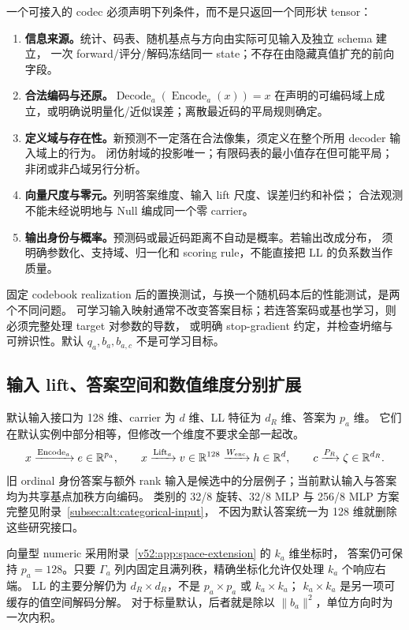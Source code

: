 \documentclass[11pt,UTF8,fontset=fandol]{ctexart}
\numberwithin{equation}{section}
\theoremstyle{definition}
\begin{document}
一个可接入的 codec 必须声明下列条件，而不是只返回一个同形状 tensor：
\begin{enumerate}
\item \textbf{信息来源。}统计、码表、随机基点与方向由实际可见输入及独立 schema 建立，
一次 forward/评分/解码冻结同一 state；不存在由隐藏真值扩充的前向字段。
\item \textbf{合法编码与还原。}$\operatorname{Decode}_a(\operatorname{Encode}_a(x))=x$
在声明的可编码域上成立，或明确说明量化/近似误差；离散最近码的平局规则确定。
\item \textbf{定义域与存在性。}新预测不一定落在合法像集，须定义在整个所用 decoder 输入域上的行为。
闭仿射域的投影唯一；有限码表的最小值存在但可能平局；非闭或非凸域另行分析。
\item \textbf{向量尺度与零元。}列明答案维度、输入 lift 尺度、误差归约和补偿；
合法观测不能未经说明地与 Null 编成同一个零 carrier。
\item \textbf{输出身份与概率。}预测码或最近码距离不自动是概率。若输出改成分布，
须明确参数化、支持域、归一化和 scoring rule，不能直接把 LL 的负系数当作质量。
\end{enumerate}
固定 codebook realization 后的置换测试，与换一个随机码本后的性能测试，是两个不同问题。
可学习输入映射通常不改变答案目标；若连答案码或基也学习，则必须完整处理 target 对参数的导数，
或明确 stop-gradient 约定，并检查坍缩与可辨识性。默认 $q_a,b_a,b_{a,c}$ 不是可学习目标。

\subsection{输入 lift、答案空间和数值维度分别扩展}
默认输入接口为 128 维、carrier 为 $d$ 维、LL 特征为 $d_R$ 维、答案为 $p_a$ 维。
它们在默认实例中部分相等，但修改一个维度不要求全部一起改。
\begin{equation}
 x\xrightarrow{\operatorname{Encode}_a}e\in\mathbb R^{p_a},\qquad
 x\xrightarrow{\operatorname{Lift}_a}v\in\mathbb R^{128}
 \xrightarrow{W_{\rm enc}}h\in\mathbb R^d,
 \qquad c\xrightarrow{P_R}\zeta\in\mathbb R^{d_R}.
 \label{v52:eq:dimension-contract}
\end{equation}
旧 ordinal 身份答案与额外 rank 输入是候选中的分层例子；当前默认输入与答案均为共享基点加秩方向编码。
类别的 32/8 旋转、32/8 MLP 与 256/8 MLP 方案完整见附录~\ref{subsec:alt:categorical-input}，
不因为默认答案统一为 128 维就删除这些研究接口。

向量型 numeric 采用附录~\ref{v52:app:space-extension} 的 $k_a$ 维坐标时，
答案仍可保持 $p_a=128$。只要 $\Gamma_a$ 列内固定且满列秩，精确坐标化允许仅处理 $k_a$ 个响应右端。
LL 的主要分解仍为 $d_R\times d_R$，不是 $p_a\times p_a$ 或 $k_a\times k_a$；
$k_a\times k_a$ 是另一项可缓存的值空间解码分解。
对于标量默认，后者就是除以 $\|b_a\|^2$，单位方向时为一次内积。
\end{document}
